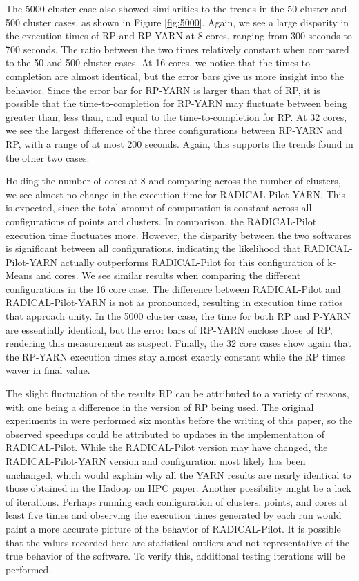 \documentclass[]{article}
\begin{document}
		The 5000 cluster case also showed similarities to the trends in the 50 cluster and 500 cluster cases, as shown in Figure \ref{fig:5000}. Again, we see a large disparity in the execution times of RP and RP-YARN at 8 cores, ranging from 300 seconds to 700 seconds. The ratio between the two times relatively constant when compared to the 50 and 500 cluster cases. At 16 cores, we notice that the times-to-completion are almost identical, but the error bars give us more insight into the behavior. Since the error bar for RP-YARN is larger than that of RP, it is possible that the time-to-completion for RP-YARN may fluctuate between being greater than, less than, and equal to the time-to-completion for RP. At 32 cores, we see the largest difference of the three configurations between RP-YARN and RP, with a range of at most 200 seconds. Again, this supports the trends found in the other two cases. 


		Holding the number of cores at 8 and comparing across the number of clusters, we see almost no change in the execution time for RADICAL-Pilot-YARN. This is expected, since the total amount of computation is constant across all configurations of points and clusters. In comparison, the RADICAL-Pilot execution time fluctuates more. However, the disparity between the two softwares is significant between all configurations, indicating the likelihood that RADICAL-Pilot-YARN actually outperforms RADICAL-Pilot for this configuration of k-Means and cores. We see similar results when comparing the different configurations in the 16 core case. The difference between RADICAL-Pilot and RADICAL-Pilot-YARN is not as pronounced, resulting in execution time ratios that approach unity. In the 5000 cluster case, the time for both RP and P-YARN are essentially identical, but the error bars of RP-YARN enclose those of RP, rendering this measurement as suspect. Finally, the 32 core cases show again that the RP-YARN execution times stay almost exactly constant while the RP times waver in final value.

		The slight fluctuation of the results RP can be attributed to a variety of reasons, with one being a difference in the version of RP being used. The original experiments in \cite{hadoop_paper} were performed six months before the writing of this paper, so the observed speedups could be attributed to updates in the implementation of RADICAL-Pilot. While the RADICAL-Pilot version may have changed, the RADICAL-Pilot-YARN version and configuration most likely has been unchanged, which would explain why all the YARN results are nearly identical to those obtained in the Hadoop on HPC paper. Another possibility might be a lack of iterations. Perhaps running each configuration of clusters, points, and cores at least five times and observing the execution times generated by each run would paint a more accurate picture of the behavior of RADICAL-Pilot. It is possible that the values recorded here are statistical outliers and not representative of the true behavior of the software. To verify this, additional testing iterations will be performed. 
\end{document}
